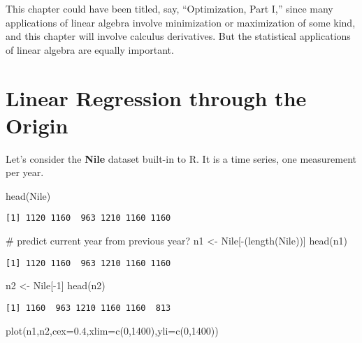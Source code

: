 \documentclass[
  letterpaper,
  DIV=11,
  numbers=noendperiod,
  oneside]{scrreprt}
\newenvironment{Shaded}{\begin{snugshade}}{\end{snugshade}}
\newcommand{\AttributeTok}[1]{\textcolor[rgb]{0.40,0.45,0.13}{#1}}
\newcommand{\CommentTok}[1]{\textcolor[rgb]{0.37,0.37,0.37}{#1}}
\newcommand{\DecValTok}[1]{\textcolor[rgb]{0.68,0.00,0.00}{#1}}
\newcommand{\FloatTok}[1]{\textcolor[rgb]{0.68,0.00,0.00}{#1}}
\newcommand{\FunctionTok}[1]{\textcolor[rgb]{0.28,0.35,0.67}{#1}}
\newcommand{\NormalTok}[1]{\textcolor[rgb]{0.00,0.23,0.31}{#1}}
\newcommand{\OtherTok}[1]{\textcolor[rgb]{0.00,0.23,0.31}{#1}}
\newcommand{\SpecialCharTok}[1]{\textcolor[rgb]{0.37,0.37,0.37}{#1}}
\begin{document}
This chapter could have been titled, say, ``Optimization, Part I,''
since many applications of linear algebra involve minimization or
maximization of some kind, and this chapter will involve calculus
derivatives. But the statistical applications of linear algebra are
equally important.

\hypertarget{linear-regression-through-the-origin}{%
\section{Linear Regression through the
Origin}\label{linear-regression-through-the-origin}}

Let's consider the \textbf{Nile} dataset built-in to R. It is a time
series, one measurement per year.

\begin{Shaded}
\begin{Highlighting}[]
\FunctionTok{head}\NormalTok{(Nile)}
\end{Highlighting}
\end{Shaded}

\begin{verbatim}
[1] 1120 1160  963 1210 1160 1160
\end{verbatim}

\begin{Shaded}
\begin{Highlighting}[]
\CommentTok{\# predict current year from previous year?}
\NormalTok{n1 }\OtherTok{\textless{}{-}}\NormalTok{ Nile[}\SpecialCharTok{{-}}\NormalTok{(}\FunctionTok{length}\NormalTok{(Nile))]}
\FunctionTok{head}\NormalTok{(n1)}
\end{Highlighting}
\end{Shaded}

\begin{verbatim}
[1] 1120 1160  963 1210 1160 1160
\end{verbatim}

\begin{Shaded}
\begin{Highlighting}[]
\NormalTok{n2 }\OtherTok{\textless{}{-}}\NormalTok{ Nile[}\SpecialCharTok{{-}}\DecValTok{1}\NormalTok{]}
\FunctionTok{head}\NormalTok{(n2)}
\end{Highlighting}
\end{Shaded}

\begin{verbatim}
[1] 1160  963 1210 1160 1160  813
\end{verbatim}

\begin{Shaded}
\begin{Highlighting}[]
\FunctionTok{plot}\NormalTok{(n1,n2,}\AttributeTok{cex=}\FloatTok{0.4}\NormalTok{,}\AttributeTok{xlim=}\FunctionTok{c}\NormalTok{(}\DecValTok{0}\NormalTok{,}\DecValTok{1400}\NormalTok{),}\AttributeTok{yli=}\FunctionTok{c}\NormalTok{(}\DecValTok{0}\NormalTok{,}\DecValTok{1400}\NormalTok{))}
\end{Highlighting}
\end{Shaded}
\end{document}
